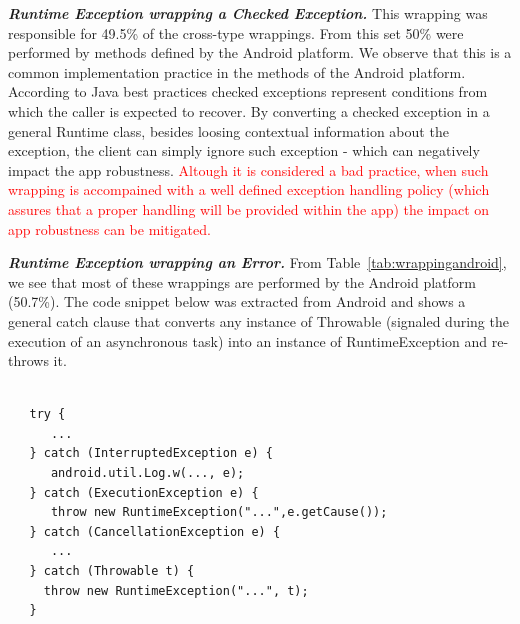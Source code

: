 \emph{\textbf{Runtime Exception wrapping a Checked Exception.}}
This wrapping was responsible for 49.5\% of
the cross-type wrappings.  From this set 50\%  were performed by methods defined by the Android platform.
We observe that this is a common implementation practice in the methods of the Android platform.
According to Java best practices checked exceptions represent conditions from which the caller
is expected to recover. By converting a checked exception in a general Runtime class,
besides loosing contextual information about the exception,
the client can simply ignore such exception - which can negatively impact the app robustness.
\textcolor{red}{Altough it is considered a bad practice, when such wrapping is accompained with a well defined
exception handling policy (which assures that a proper handling will be provided within the app)
the impact on app robustness can be mitigated.}

\bigskip


\bigskip

\emph{\textbf{Runtime Exception wrapping an Error.}}
From Table~\ref{tab:wrappingandroid}, we see that most of these wrappings
are performed by the Android platform (50.7\%).
The code snippet below was extracted from Android and shows a general catch clause
that converts any instance of Throwable (signaled during the execution
of an asynchronous task) into an instance of RuntimeException and re-throws it.

{\footnotesize
\begin{verbatim}

   try {
      ...
   } catch (InterruptedException e) {
      android.util.Log.w(..., e);
   } catch (ExecutionException e) {
      throw new RuntimeException("...",e.getCause());
   } catch (CancellationException e) {
      ...
   } catch (Throwable t) {
     throw new RuntimeException("...", t);
   }
\end{verbatim}
}

